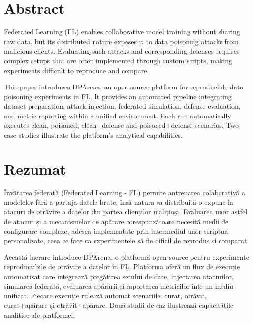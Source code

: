 \chapter*{Abstract}

\thispagestyle{front}

Federated Learning (FL) enables collaborative model training without sharing raw data, but its distributed nature exposes it to data poisoning attacks from malicious clients. Evaluating such attacks and corresponding defenses requires complex setups that are often implemented through custom scripts, making experiments difficult to reproduce and compare. 

This paper introduces DPArena, an open-source platform for reproducible data poisoning experiments in FL. It provides an automated pipeline integrating dataset preparation, attack injection, federated simulation, defense evaluation, and metric reporting within a unified environment. Each run automatically executes clean, poisoned, clean+defense and poisoned+defense scenarios. Two case studies illustrate the platform's analytical capabilities.


\thispagestyle{front}

\newpage

\chapter*{Rezumat}

\thispagestyle{front}

Învățarea federată (Federated Learning - FL) permite antrenarea colaborativă a modelelor fără a partaja datele brute, însă natura sa distribuită o expune la atacuri de otrăvire a datelor din partea clienților malițioși. Evaluarea unor astfel de atacuri și a mecanismelor de apărare corespunzătoare necesită medii de configurare complexe, adesea implementate prin intermediul unor scripturi personalizate, ceea ce face ca experimentele să fie dificil de reprodus și comparat. 

Această lucrare introduce DPArena, o platformă open-source pentru experimente reproductibile de otrăvire a datelor în FL. Platforma oferă un flux de execuție automatizat care integrează pregătirea setului de date, injectarea atacurilor, simularea federată, evaluarea apărării și raportarea metricilor într-un mediu unificat. Fiecare execuție rulează automat scenariile: curat, otrăvit, curat+apărare și otrăvit+apărare. Două studii de caz ilustrează capacitățile analitice ale platformei.

\thispagestyle{front}
